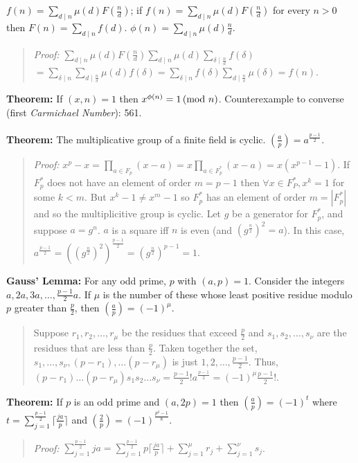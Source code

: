 $f(n)= \sum_{d \mid n} \mu(d) F({\frac {n} {d}})$;  if
$f(n)= \sum_{d \mid n} \mu(d) F({\frac {n} {d}})$ for every $n>0$ then
$F(n)=  \sum_{d \mid n} f(d)$.
$\phi(n)=  \sum_{d \mid n} \mu(d) {\frac {n} {d}}$.
\begin{quote}
\emph{Proof:}
$\sum_{d \mid n} \mu(d) F({\frac {n} {d}})
\sum_{d \mid n} \mu(d) \sum_{\delta  \mid  {\frac n d}} f(\delta)$
$=\sum_{\delta  \mid n} \sum_{d  \mid  {\frac n \delta}} \mu(d) f(\delta)=
\sum_{\delta  \mid n} f(\delta) \sum_{d  \mid  {\frac n \delta}} \mu(\delta) = f(n)$.
\end{quote}
{\bf Theorem:} If $(x,n)=1$ then $x^{\phi(n)}= 1 \thinspace \textnormal{(mod } n \textnormal{)}$.  Counterexample to converse
(first \emph{Carmichael Number}): 561.
\\
\\
{\bf Theorem:}
The multiplicative group of a finite field is cyclic.
$({\frac {a} {p}}) = a^{\frac {p-1} {2}}$.
\begin{quote}
\emph{Proof:}
$x^p-x = \prod_{a \in F_p} (x-a) = x \prod_{a \in F_p^*} (x-a) = x (x^{p-1} -1) $.
If $F_p^*$ does not have an element of order $m=p-1$ then $\forall x \in F_P^*, x^k = 1$
for some $k < m$. But $x^k-1 \ne x^m -1$ so $F_p^*$ has an element of order
$m = |F_p^*|$ and so the multiplicitive group is cyclic.  Let $g$ be a generator for
$F_p^*$, and suppose $a = g^n$.  $a$ is a square iff $n$ is even (and $(g^{\frac n 2})^2 = a$).
In this case, 
$a^{\frac {p-1} {2}}= ((g^{\frac n 2})^2)^{\frac {p-1} 2} = (g^{\frac n 2})^{p-1} = 1$.
\end{quote}
{\bf Gauss' Lemma:} 
For any odd prime, $p$ with $(a,p)=1$.  Consider the integers
$a, 2a, 3a, \ldots, {\frac {p-1} 2}a$.  If $\mu$ is the number of
these whose least positive residue modulo $p$ greater than ${\frac p 2}$,
then $({\frac a p})= (-1)^{\mu}$.
\begin{quote}
Suppose $r_1 , r_2 , \ldots , r_{\mu}$ be the residues that exceed ${\frac p 2}$
and $s_1, s_2 , \ldots , s_{\nu}$ are the residues that are less
than ${\frac p 2}$.  Taken together the set, $s_1, \ldots, s_{\nu},
(p-r_1), \ldots (p-r_{\mu})$ is just
$1, 2, \ldots , {\frac {p-1} 2}$.  Thus,
$(p-r_1 ) \ldots (p-r_{\mu})s_1 s_2 \ldots s_{\nu} =
{\frac {p-1} 2}! a^{\frac {p-1} 2} = (-1)^{\mu} {\frac {p-1} 2}!$.
\end{quote}
{\bf Theorem:} 
If $p$ is an odd prime and $(a,2p)=1$ then $({\frac a p}) = (-1)^t$ where
$t= \sum_{j=1}^{\frac {p-1} 2} \lceil {\frac {ja} p} \rceil$ and $({\frac 2 p})=
(-1)^{\frac {p^2 -1} 8}$.
\begin{quote}
\emph{Proof:}
$\sum_{j=1}^{\frac {p-1} 2} ja =
\sum_{j=1}^{\frac {p-1} 2} p \lceil {\frac {ja} p} \rceil + \sum_{j=1}^{\mu} r_j +
\sum_{j=1}^{\nu} s_j$.
\end{quote}
